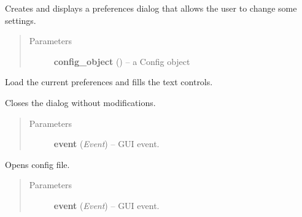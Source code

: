 \documentclass[letterpaper,10pt,english]{sphinxmanual}
\begin{document}

\begin{fulllineitems}
\label{dialogs:dialogs.PreferencesDialog}
Creates and displays a preferences dialog that allows the user to
change some settings.
\begin{quote}\begin{description}
\item[{Parameters}] \leavevmode
\textbf{config\_object} () -- a Config object

\end{description}\end{quote}

\begin{fulllineitems}
\label{dialogs:dialogs.PreferencesDialog.LoadPreferences}
Load the current preferences and fills the text controls.

\end{fulllineitems}


\begin{fulllineitems}
\label{dialogs:dialogs.PreferencesDialog.OnCancel}
Closes the dialog without modifications.
\begin{quote}\begin{description}
\item[{Parameters}] \leavevmode
\textbf{event} (\emph{Event}) -- GUI event.

\end{description}\end{quote}

\end{fulllineitems}


\begin{fulllineitems}
\label{dialogs:dialogs.PreferencesDialog.OpenConfig}
Opens config file.
\begin{quote}\begin{description}
\item[{Parameters}] \leavevmode
\textbf{event} (\emph{Event}) -- GUI event.


\end{description}
\end{quote}
\end{fulllineitems}
\end{fulllineitems}
\end{document}
